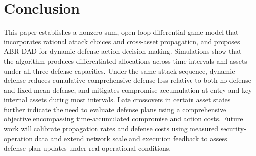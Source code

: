 \documentclass[conference,letterpaper]{IEEEtran}
\begin{document}
\section{Conclusion}
This paper establishes a nonzero-sum, open-loop differential-game model that incorporates rational attack choices and cross-asset propagation, and proposes ABR-DAD for dynamic defense action decision-making. Simulations show that the algorithm produces differentiated allocations across time intervals and assets under all three defense capacities. Under the same attack sequence, dynamic defense reduces cumulative comprehensive defense loss relative to both no defense and fixed-mean defense, and mitigates compromise accumulation at entry and key internal assets during most intervals. Late crossovers in certain asset states further indicate the need to evaluate defense plans using a comprehensive objective encompassing time-accumulated compromise and action costs. Future work will calibrate propagation rates and defense costs using measured security-operation data and extend network scale and execution feedback to assess defense-plan updates under real operational conditions.
\end{document}
